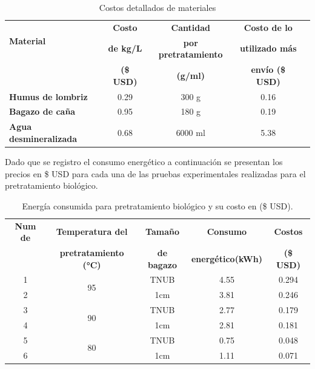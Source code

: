 \documentclass[12pt]{article}
\begin{document}
\begin{table}[H]
	\centering
	
	\caption{Costos detallados de materiales}
	\label{tab:costos_completos}
	\footnotesize
	\setlength{\tabcolsep}{2.5pt}
	\begin{tabular}{|l|c|c|c|c|}
		\hline
		\multirow{2}{*}{\textbf{Material}} & \textbf{Costo} & \textbf{Cantidad} &  \textbf{Costo de lo} \\
		& \textbf{ de kg/L} & \textbf{ por pretratamiento}  &  \textbf{utilizado más} \\
		& \textbf{ (\$ USD)} & \textbf{(g/ml)}  & \textbf{envío (\$ USD)} \\
		\hline
		\textbf{Humus de lombriz} & 0.29 & 300 g &   0.16 \\
		\hline
		\textbf{Bagazo de caña} & 0.95 & 180 g &   0.19 \\
		\hline
		\textbf{Agua desmineralizada} & 0.68 & 6000 ml &  5.38 \\
		\hline
	\end{tabular}
\end{table}

Dado que se registro el consumo energético a continuación se presentan los precios en \$ USD para cada una de las pruebas experimentales realizadas para el pretratamiento biológico.
	
	
	\begin{table}[H]
		\centering
		\caption{Energía consumida para pretratamiento biológico  y su costo en (\$ USD). }
		\label{tabla de energia}
	\setlength{\tabcolsep}{2.5pt}
		\begin{tabular}{|c|c|c|c|c|}
			\hline
		\textbf{Num de}&\textbf{Temperatura del} & \textbf{Tamaño }  & \textbf{ Consumo } & \textbf{Costos } \\ 
			&\textbf{ pretratamiento (°C)} &	\textbf{ de bagazo}  & 	\textbf{energético(kWh) }& 	\textbf{(\$ USD)} \\ \hline
     1  & \multirow{2}{*}{95} & TNUB & 4.55 & 0.294 \\ \cline{3-5} \cline{1-1}
2	& & 1cm & 3.81 & 0.246 \\ \hline 
3&\multirow{2}{*}{90} & TNUB & 2.77 & 0.179 \\ \cline{3-5} \cline{1-1}
4	& & 1cm & 2.81 & 0.181  \\ \hline 
5&\multirow{2}{*}{80}	 & TNUB & 0.75 & 0.048  \\ \cline{3-5} \cline{1-1}
6&	 & 1cm & 1.11 & 0.071  \\ 	\hline		
		\end{tabular}
	
	\end{table}
	
\end{document}
